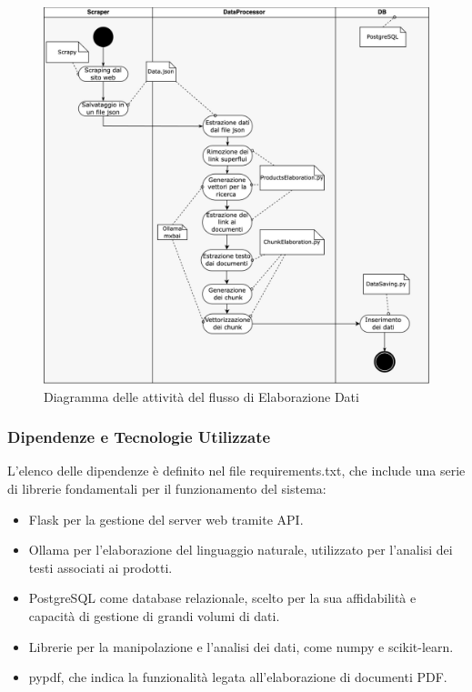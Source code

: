 \begin{figure}[H]
    \centering
    \includegraphics[width=\textwidth]{images/flussoSalvataggioDati.png}
    \caption{Diagramma delle attivit\`a del flusso di Elaborazione Dati}
    \label{fig:architettura}
\end{figure}


\subsubsection{ Dipendenze e Tecnologie Utilizzate}
L’elenco delle dipendenze è definito nel file requirements.txt, che include una serie di librerie fondamentali per il funzionamento del sistema:

\begin{itemize}
    
\item Flask per la gestione del server web tramite API.

\item Ollama per l’elaborazione del linguaggio naturale,  utilizzato per l'analisi dei testi associati ai prodotti.

\item PostgreSQL come database relazionale, scelto per la sua affidabilità e capacità di gestione di grandi volumi di dati.

\item Librerie per la manipolazione e l'analisi dei dati, come numpy e scikit-learn.

\item pypdf, che indica la funzionalità legata all'elaborazione di documenti PDF.

\end{itemize}
